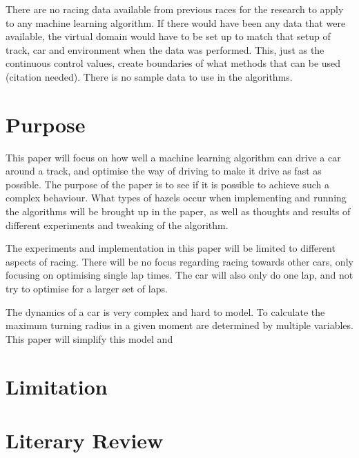 There are no racing data available from previous races for the research to apply to any machine learning algorithm. If there would have been any data that were available, the virtual domain would have to be set up to match that setup of track, car and environment when the data was performed. This, just as the continuous control values, create boundaries of what methods that can be used (citation needed). There is no sample data to use in the algorithms. 

\section{Purpose}
This paper will focus on how well a machine learning algorithm can drive a car around a track, and optimise the way of driving to make it drive as fast as possible. The purpose of the paper is to see if it is possible to achieve such a complex behaviour. What types of hazels occur when implementing and running the algorithms will be brought up in the paper, as well as thoughts and results of different experiments and tweaking of the algorithm.

The experiments and implementation in this paper will be limited to different aspects of racing. There will be no focus regarding racing towards other cars, only focusing on optimising single lap times. The car will also only do one lap, and not try to optimise for a larger set of laps.

The dynamics of a car is very complex and hard to model. To calculate the maximum turning radius in a given moment are determined by multiple variables. This paper will simplify this model and %
\section{Limitation}

\section{Literary Review}
